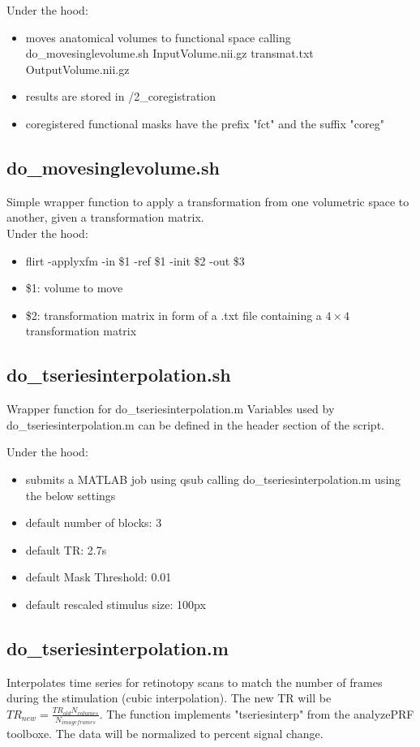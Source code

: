\documentclass[12pt,a4paper]{scrartcl}
\begin{document}
\noindent Under the hood:
\begin{itemize}
\item moves anatomical volumes to functional space calling do\_movesinglevolume.sh InputVolume.nii.gz transmat.txt OutputVolume.nii.gz
\item results are stored in /2\_coregistration
\item coregistered functional masks have the prefix "fct" and the suffix "coreg"
\end{itemize}

\subsection{do\_movesinglevolume.sh}
Simple wrapper function to apply a transformation from one volumetric space to another, given a transformation matrix.\\

\noindent Under the hood:
\begin{itemize}
\item flirt -applyxfm -in \$1 -ref \$1 -init \$2 -out \$3
\item \$1: volume to move
\item \$2: transformation matrix in form of a .txt file containing a $4\times4$ transformation matrix
\end{itemize}

\subsection{do\_tseriesinterpolation.sh}
\label{sec:tseriesinterp}
Wrapper function for do\_tseriesinterpolation.m Variables used by do\_tseriesinterpolation.m can be defined in the header section of the script.

\noindent Under the hood:
\begin{itemize}
\item submits a MATLAB job using qsub calling do\_tseriesinterpolation.m using the below settings
\item default number of blocks: 3
\item default TR: 2.7s
\item default Mask Threshold: 0.01
\item default rescaled stimulus size: 100px
\end{itemize}

\subsection{do\_tseriesinterpolation.m}
Interpolates time series for retinotopy scans to match the number of frames during the stimulation (cubic interpolation). The new TR will be $TR_{new}=\frac{TR_{old}N_{volumes}}{N_{imageframes}}$. The function implements "tseriesinterp" from the analyzePRF toolboxe. The data will be normalized to percent signal change.\\
\end{document}
